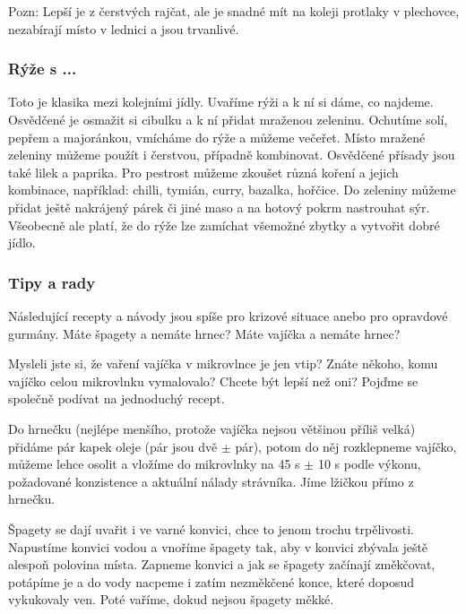Pozn: Lepší je z čerstvých rajčat, ale je snadné mít na koleji protlaky v
plechovce, nezabírají místo v lednici a jsou trvanlivé.


\subsubsection*{Rýže s ...}
Toto je klasika mezi kolejními jídly. Uvaříme rýži a k ní si dáme, co najdeme.
Osvědčené je osmažit si cibulku a k ní přidat mraženou zeleninu. Ochutíme solí,
pepřem a majoránkou, vmícháme do rýže a můžeme večeřet. Místo mražené zeleniny
můžeme použít i čerstvou, případně kombinovat. Osvědčené přísady jsou také lilek
a paprika. Pro pestrost můžeme zkoušet různá koření a jejich kombinace,
například: chilli, tymián, curry, bazalka, hořčice. Do zeleniny můžeme přidat
ještě nakrájený párek či jiné maso a na hotový pokrm nastrouhat sýr. Všeobecně
ale platí, že do rýže lze zamíchat všemožné zbytky a vytvořit dobré jídlo.


\subsubsection*{Tipy a rady}
Následující recepty a návody jsou spíše pro krizové situace anebo pro opravdové
gurmány. Máte špagety a nemáte hrnec? Máte vajíčka a nemáte hrnec?


Mysleli jste si, že vaření vajíčka v mikrovlnce je jen vtip? Znáte někoho, komu
vajíčko celou mikrovlnku vymalovalo? Chcete být lepší než oni? Pojďme se
společně podívat na jednoduchý recept.

Do hrnečku (nejlépe menšího, protože vajíčka nejsou většinou příliš velká)
přidáme pár kapek oleje (pár jsou dvě $\pm$ pár), potom do něj rozklepneme
vajíčko, můžeme lehce osolit a vložíme do mikrovlnky na 45 s $\pm$ 10 s podle
výkonu, požadované konzistence a aktuální nálady strávníka. Jíme lžičkou přímo z
hrnečku.


Špagety se dají uvařit i ve varné konvici, chce to jenom trochu trpělivosti.
Napustíme konvici vodou a vnoříme špagety tak, aby v konvici zbývala ještě
alespoň polovina místa. Zapneme konvici a jak se špagety začínají změkčovat,
potápíme je a do vody nacpeme i zatím nezměkčené konce, které doposud vykukovaly
ven. Poté vaříme, dokud nejsou špagety měkké.


